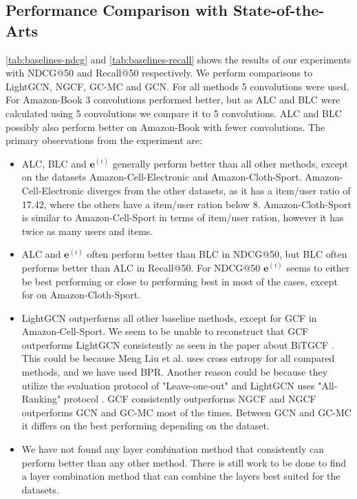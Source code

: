 \subsection{Performance Comparison with State-of-the-Arts}
\autoref{tab:baselines-ndcg} and \autoref{tab:baselines-recall} shows the results of our experiments with NDCG@50 and Recall@50 respectively.
We perform comparisons to LightGCN, NGCF, GC-MC and GCN.
For all methods 5 convolutions were used. For Amazon-Book 3 convolutions performed better, but as ALC and BLC were calculated using 5 convolutions we compare it to 5 convolutions.
ALC and BLC possibly also perform better on Amazon-Book with fewer convolutions.
The primary observations from the experiment are:
\begin{itemize}
    \item ALC, BLC and $\mathbf{e}^{(i)}$ generally perform better than all other methods, except on the datasets Amazon-Cell-Electronic and Amazon-Cloth-Sport. Amazon-Cell-Electronic diverges from the other datasets, as it has a item/user ratio of 17.42, where the others have a item/user ration below 8. Amazon-Cloth-Sport is similar to Amazon-Cell-Sport in terms of item/user ration, however it has twice as many users and items.
    \item ALC and $\mathbf{e}^{(i)}$ often perform better than BLC in NDCG@50, but BLC often performs better than ALC in Recall@50. For NDCG@50 $\mathbf{e}^{(i)}$ seems to either be best performing or close to performing best in most of the cases, except for on Amazon-Cloth-Sport.
    \item LightGCN outperforms all other baseline methods, except for GCF in Amazon-Cell-Sport. We seem to be unable to reconstruct that GCF outperforms LightGCN consistently as seen in the paper about BiTGCF \cite{BiTGCF}. This could be because Meng Liu et al. uses cross entropy for all compared methods, and we have used BPR. Another reason could be because they utilize the evaluation protocol of "Leave-one-out" and LightGCN uses "All-Ranking" protocol \cite{BiTGCF,lightgcn}. GCF consistently outperforms NGCF and NGCF outperforms GCN and GC-MC most of the times. Between GCN and GC-MC it differs on the best performing depending on the dataset.
    \item We have not found any layer combination method that consistently can perform better than any other method. There is still work to be done to find a layer combination method that can combine the layers best suited for the datasets.
\end{itemize}
